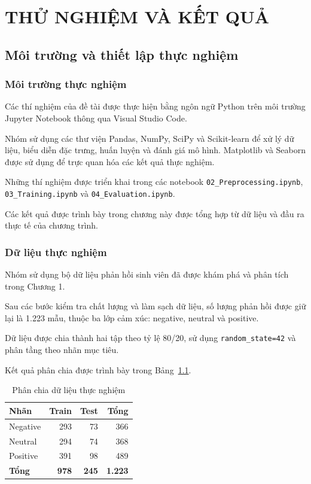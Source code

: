 
\chapter{THỬ NGHIỆM VÀ KẾT QUẢ}


\section{Môi trường và thiết lập thực nghiệm}

\subsection{Môi trường thực nghiệm}

Các thí nghiệm của đề tài được thực hiện bằng ngôn ngữ
Python trên môi trường Jupyter Notebook thông qua Visual
Studio Code.

Nhóm sử dụng các thư viện Pandas, NumPy, SciPy và
Scikit-learn để xử lý dữ liệu, biểu diễn đặc trưng, huấn
luyện và đánh giá mô hình. Matplotlib và Seaborn được
sử dụng để trực quan hóa các kết quả thực nghiệm.

Những thí nghiệm được triển khai trong các notebook
\texttt{02\_Preprocessing.ipynb},
\texttt{03\_Training.ipynb} và
\texttt{04\_Evaluation.ipynb}.

Các kết quả được trình bày trong chương này được tổng
hợp từ dữ liệu và đầu ra thực tế của chương trình.

\subsection{Dữ liệu thực nghiệm}

Nhóm sử dụng bộ dữ liệu phản hồi sinh viên đã được
khám phá và phân tích trong Chương 1.

Sau các bước kiểm tra chất lượng và làm sạch dữ liệu,
số lượng phản hồi được giữ lại là 1.223 mẫu, thuộc
ba lớp cảm xúc: negative, neutral và positive.

Dữ liệu được chia thành hai tập theo tỷ lệ 80/20,
sử dụng \texttt{random\_state=42} và phân tầng
theo nhãn mục tiêu.

Kết quả phân chia được trình bày trong
Bảng~\ref{tab:ch4-chia-du-lieu}.

\begin{table}[H]
\centering
\caption{Phân chia dữ liệu thực nghiệm}
\label{tab:ch4-chia-du-lieu}
\renewcommand{\arraystretch}{1.15}

\begin{tabular}{|l|r|r|r|}
\hline
\textbf{Nhãn}
& \textbf{Train}
& \textbf{Test}
& \textbf{Tổng} \\
\hline
Negative & 293 & 73 & 366 \\
\hline
Neutral & 294 & 74 & 368 \\
\hline
Positive & 391 & 98 & 489 \\
\hline
\textbf{Tổng}
& \textbf{978}
& \textbf{245}
& \textbf{1.223} \\
\hline
\end{tabular}
\end{table}

